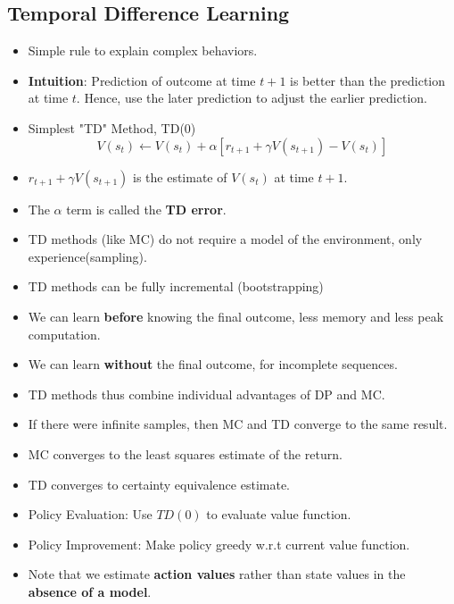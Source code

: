 \documentclass[a4paper]{article}
\begin{document}
\subsection{Temporal Difference Learning}
\begin{itemize}
    \item Simple rule to explain complex behaviors.
    \item \textbf{Intuition}: Prediction of outcome at time $t+1$ is better than the prediction at time $t$. Hence, use the later prediction to adjust the earlier prediction.
    \item Simplest "TD" Method, TD($0$)
    \begin{equation*}
        V(s_t)\gets V(s_t)+\alpha[r_{t+1}+\gamma V(s_{t+1})-V(s_t)]
    \end{equation*}
    \item $r_{t+1}+\gamma V(s_{t+1})$ is the estimate of $V(s_t)$ at time $t+1$.
    \item The $\alpha$ term is called the \textbf{TD error}.
    \item TD methods (like MC) do not require a model of the environment, only experience(sampling).
    \item TD methods can be fully incremental (bootstrapping)
    \item We can learn \textbf{before} knowing the final outcome, less memory and less peak computation.
    \item We can learn \textbf{without} the final outcome, for incomplete sequences.
    \item TD methods thus combine individual advantages of DP and MC.
    \item If there were infinite samples, then MC and TD converge to the same result.
    \item MC converges to the least squares estimate of the return.
    \item TD converges to certainty equivalence estimate.
    \item Policy Evaluation: Use $TD(0)$ to evaluate value function.
    \item Policy Improvement: Make policy greedy w.r.t current value function.
    \item Note that we estimate \textbf{action values} rather than state values in the \textbf{absence of a model}.
\end{itemize}
\end{document}
